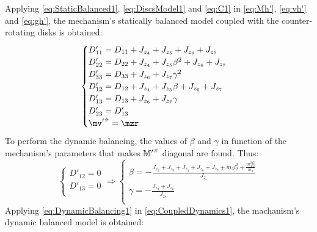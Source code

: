\documentclass[a4paper,11pt,brazil,fleqn]{article}
\begin{document}
Applying \eqref{eq:StaticBalanced1}, \eqref{eq:DiscsModel1} and \eqref{eq:C1} in \eqref{eq:Mh'}, \eqref{eq:vh'} and \eqref{eq:gh'}, the mechanism's statically balanced model coupled with the counter-rotating disks is obtained:
\begin{equation}\label{eq:CoupledDynamics1}
\begin{cases}
D'_{11} = D_{11} + J_{z_4} + J_{z_5} + J_{z_6} + J_{z_7} \\
D'_{22} = D_{22} + J_{z_4} + J_{z_5} \beta^2 + J_{z_6} + J_{z_7} \\
D'_{33} = D_{33} + J_{z_6} + J_{z_7} \gamma^2 \\
D'_{12} = D_{12} + J_{z_4} + J_{z_5} \beta + J_{z_6} + J_{z_7} \\
D'_{13} = D_{13} + J_{z_6} + J_{z_7} \gamma  \\
D'_{23} = D'_{13}\\
{\mv'}\ssh = \mzr \\
\end{cases}
\end{equation}
To perform the dynamic balancing, the values of $\beta$ and $\gamma$ in function of the mechanism's parameters that makes ${\mathbb{M}'}^{\scriptscriptstyle \#}$ diagonal are found. Thus:
\begin{equation}\label{eq:DynamicBalancing1}
\begin{cases}
D'_{12} = 0 \\
D'_{13} = 0 \\
\end{cases}
\Rightarrow
\begin{cases}
\beta = -\frac{J_{z_2} + J_{z_3} + J_{z_4} + J_{z_6} + J_{z_7} + m_3 l_2^2 + \frac{m_3^2 l_2^2}{m_2}}{J_{z_5}} \\
\gamma = -\frac{J_{z_3} + J_{z_6}}{J_{z_7}} \\
\end{cases}
\end{equation}
Applying \eqref{eq:DynamicBalancing1} in \eqref{eq:CoupledDynamics1}, the machanism's dynamic balanced model is obtained: 
\end{document}
